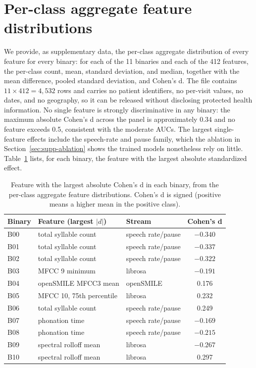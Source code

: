 \documentclass[utf8]{frontiers_suppmat} %
\begin{document}
\section{Per-class aggregate feature distributions}
\label{sec:supp-feature-distributions}

We provide, as supplementary data, the per-class aggregate distribution
of every feature for every binary: for each of the 11 binaries and each
of the 412 features, the per-class count, mean, standard deviation, and
median, together with the mean difference, pooled standard deviation,
and Cohen's d. The file contains $11 \times 412 = 4{,}532$ rows and
carries no patient identifiers, no per-visit values, no dates, and no
geography, so it can be released without disclosing protected health
information. No single feature is strongly discriminative in any binary:
the maximum absolute Cohen's d across the panel is approximately 0.34
and no feature exceeds 0.5, consistent with the moderate AUCs. The
largest single-feature effects include the speech-rate and pause family,
which the ablation in Section~\ref{sec:supp-ablation} shows the trained
models nonetheless rely on little. Table~\ref{tab:supp-topfeature}
lists, for each binary, the feature with the largest absolute
standardized effect.

\begin{table}[t]
\centering
\caption{Feature with the largest absolute Cohen's d in each binary,
from the per-class aggregate feature distributions. Cohen's d is signed
(positive means a higher mean in the positive class).}
\label{tab:supp-topfeature}
\footnotesize
\setlength{\tabcolsep}{6pt}
\renewcommand{\arraystretch}{1.15}
\begin{tabular}{@{}l l l c@{}}
\toprule
Binary & Feature (largest $|d|$) & Stream & Cohen's d \\
\midrule
B00 & total syllable count & speech rate/pause & $-0.340$ \\
B01 & total syllable count & speech rate/pause & $-0.337$ \\
B02 & total syllable count & speech rate/pause & $-0.322$ \\
B03 & MFCC 9 minimum & librosa & $-0.191$ \\
B04 & openSMILE MFCC3 mean & openSMILE & 0.176 \\
B05 & MFCC 10, 75th percentile & librosa & 0.232 \\
B06 & total syllable count & speech rate/pause & 0.249 \\
B07 & phonation time & speech rate/pause & $-0.169$ \\
B08 & phonation time & speech rate/pause & $-0.215$ \\
B09 & spectral rolloff mean & librosa & $-0.267$ \\
B10 & spectral rolloff mean & librosa & 0.297 \\
\bottomrule
\end{tabular}
\end{table}



\end{document}
